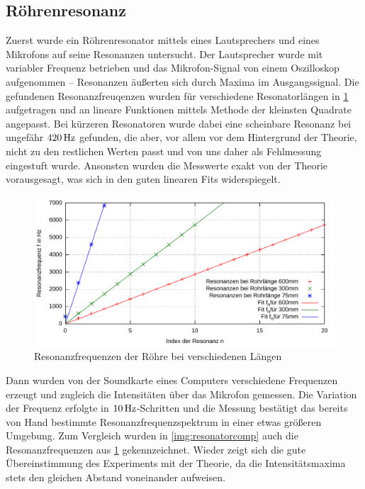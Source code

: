 \documentclass[numbers=noenddot,12pt,a4paper]{scrartcl}
\begin{document}
\subsection{Röhrenresonanz}
Zuerst wurde ein Röhrenresonator mittels eines Lautsprechers und eines Mikrofons auf seine Resonanzen untersucht. Der Lautsprecher wurde mit variabler Frequenz betrieben und das Mikrofon-Signal von einem Oszilloskop aufgenommen -- Resonanzen äußerten sich durch Maxima im Ausgangssignal. Die gefundenen Resonanzfreuqenzen wurden für verschiedene Resonatorlängen in \ref{img:resonatorhand} aufgetragen und an lineare Funktionen mittels Methode der kleinsten Quadrate angepasst. Bei kürzeren Resonatoren wurde dabei eine scheinbare Resonanz bei ungefähr $\unit[420]{Hz}$ gefunden, die aber, vor allem vor dem Hintergrund der Theorie, nicht zu den restlichen Werten passt und von uns daher als Fehlmessung eingestuft wurde. Ansonsten wurden die Messwerte exakt von der Theorie vorausgesagt, was sich in den guten linearen Fits widerspiegelt.
\begin{figure}[H]
	\includegraphics[width=\textwidth]{messwerte/resonanzfrequenzen.pdf}
	\caption{Resonanzfrequenzen der Röhre bei verschiedenen Längen}\label{img:resonatorhand}
\end{figure}
Dann wurden von der Soundkarte eines Computers verschiedene Frequenzen erzeugt und zugleich die Intensitäten über das Mikrofon gemessen. Die Variation der Frequenz erfolgte in $\unit[10]{Hz}$-Schritten und die Messung bestätigt das bereits von Hand bestimmte Resonanzfrequenzspektrum in einer etwas größeren Umgebung. Zum Vergleich wurden in \ref{img:resonatorcomp} auch die Resonanzfrequenzen aus \ref{img:resonatorhand} gekennzeichnet. Wieder zeigt sich die gute Übereinstimmung des Experiments mit der Theorie, da die Intensitätsmaxima stets den gleichen Abstand voneinander aufweisen.
\end{document}
